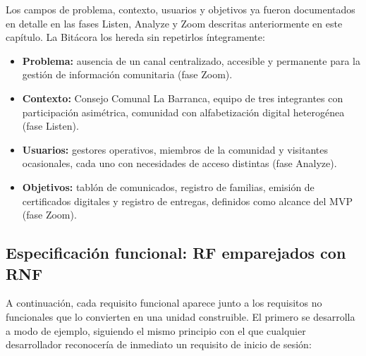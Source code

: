 \documentclass[14pt,a4paper,oneside]{extbook}
\begin{document}
Los campos de problema, contexto, usuarios y objetivos ya fueron documentados en detalle en las fases Listen, Analyze y Zoom descritas anteriormente en este capítulo. La Bitácora los hereda sin repetirlos íntegramente:

\begin{itemize}
\item \textbf{Problema:} ausencia de un canal centralizado, accesible y permanente para la gestión de información comunitaria (fase Zoom).
\item \textbf{Contexto:} Consejo Comunal La Barranca, equipo de tres integrantes con participación asimétrica, comunidad con alfabetización digital heterogénea (fase Listen).
\item \textbf{Usuarios:} gestores operativos, miembros de la comunidad y visitantes ocasionales, cada uno con necesidades de acceso distintas (fase Analyze).
\item \textbf{Objetivos:} tablón de comunicados, registro de familias, emisión de certificados digitales y registro de entregas, definidos como alcance del MVP (fase Zoom).
\end{itemize}

\subsection{Especificación funcional: RF emparejados con RNF}

A continuación, cada requisito funcional aparece junto a los requisitos no funcionales que lo
convierten en una unidad construible. El primero se desarrolla a modo de ejemplo, siguiendo el
mismo principio con el que cualquier desarrollador reconocería de inmediato un requisito de inicio
de sesión:
\end{document}
